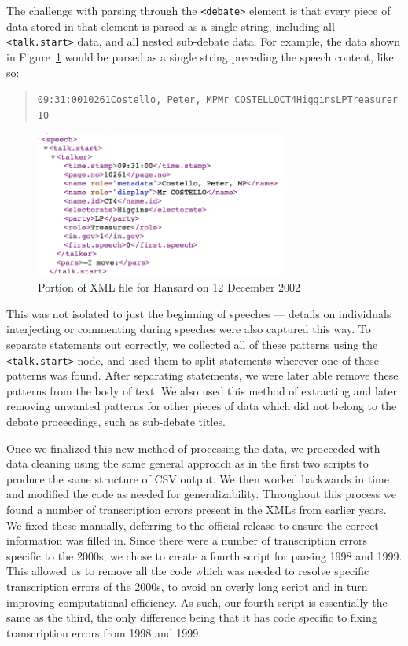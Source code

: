 \documentclass[
  letterpaper,
  DIV=11,
  numbers=noendperiod]{scrartcl}
\begin{document}
The challenge with parsing through the
\texttt{\textless{}debate\textgreater{}} element is that every piece of
data stored in that element is parsed as a single string, including all
\texttt{\textless{}talk.start\textgreater{}} data, and all nested
sub-debate data. For example, the data shown in
Figure~\ref{fig-patternEX} would be parsed as a single string preceding
the speech content, like so:

\begin{quote}
\texttt{09:31:0010261Costello,\ Peter,\ MPMr\ COSTELLOCT4HigginsLPTreasurer10}
\end{quote}

\begin{figure}

{\centering \includegraphics[width=3.28125in,height=\textheight]{images/patternEX.png}

}

\caption{\label{fig-patternEX}Portion of XML file for Hansard on 12
December 2002}

\end{figure}

This was not isolated to just the beginning of speeches --- details on
individuals interjecting or commenting during speeches were also
captured this way. To separate statements out correctly, we collected
all of these patterns using the
\texttt{\textless{}talk.start\textgreater{}} node, and used them to
split statements wherever one of these patterns was found. After
separating statements, we were later able remove these patterns from the
body of text. We also used this method of extracting and later removing
unwanted patterns for other pieces of data which did not belong to the
debate proceedings, such as sub-debate titles.

Once we finalized this new method of processing the data, we proceeded
with data cleaning using the same general approach as in the first two
scripts to produce the same structure of CSV output. We then worked
backwards in time and modified the code as needed for generalizability.
Throughout this process we found a number of transcription errors
present in the XMLs from earlier years. We fixed these manually,
deferring to the official release to ensure the correct information was
filled in. Since there were a number of transcription errors specific to
the 2000s, we chose to create a fourth script for parsing 1998 and 1999.
This allowed us to remove all the code which was needed to resolve
specific transcription errors of the 2000s, to avoid an overly long
script and in turn improving computational efficiency. As such, our
fourth script is essentially the same as the third, the only difference
being that it has code specific to fixing transcription errors from 1998
and 1999.
\end{document}
